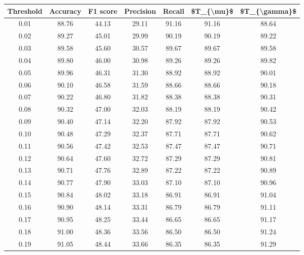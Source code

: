 \begin{tabular}{|c|c|c|c|c|c|c|}
\hline
 Threshold &  Accuracy &  F1 score &  Precision &  Recall &  \$T\_\{\textbackslash mu\}\$ &  \$T\_\{\textbackslash gamma\}\$ \\
\hline
      0.01 &     88.76 &     44.13 &      29.11 &   91.16 &      91.16 &         88.64 \\
      0.02 &     89.27 &     45.01 &      29.99 &   90.19 &      90.19 &         89.22 \\
      0.03 &     89.58 &     45.60 &      30.57 &   89.67 &      89.67 &         89.58 \\
      0.04 &     89.80 &     46.00 &      30.98 &   89.26 &      89.26 &         89.82 \\
      0.05 &     89.96 &     46.31 &      31.30 &   88.92 &      88.92 &         90.01 \\
      0.06 &     90.10 &     46.58 &      31.59 &   88.66 &      88.66 &         90.18 \\
      0.07 &     90.22 &     46.80 &      31.82 &   88.38 &      88.38 &         90.31 \\
      0.08 &     90.32 &     47.00 &      32.03 &   88.19 &      88.19 &         90.42 \\
      0.09 &     90.40 &     47.14 &      32.20 &   87.92 &      87.92 &         90.53 \\
      0.10 &     90.48 &     47.29 &      32.37 &   87.71 &      87.71 &         90.62 \\
      0.11 &     90.56 &     47.42 &      32.53 &   87.47 &      87.47 &         90.71 \\
      0.12 &     90.64 &     47.60 &      32.72 &   87.29 &      87.29 &         90.81 \\
      0.13 &     90.71 &     47.76 &      32.89 &   87.22 &      87.22 &         90.89 \\
      0.14 &     90.77 &     47.90 &      33.03 &   87.10 &      87.10 &         90.96 \\
      0.15 &     90.84 &     48.02 &      33.18 &   86.91 &      86.91 &         91.04 \\
      0.16 &     90.90 &     48.14 &      33.31 &   86.79 &      86.79 &         91.11 \\
      0.17 &     90.95 &     48.25 &      33.44 &   86.65 &      86.65 &         91.17 \\
      0.18 &     91.00 &     48.36 &      33.56 &   86.50 &      86.50 &         91.24 \\
      0.19 &     91.05 &     48.44 &      33.66 &   86.35 &      86.35 &         91.29 \\

\end{tabular}
